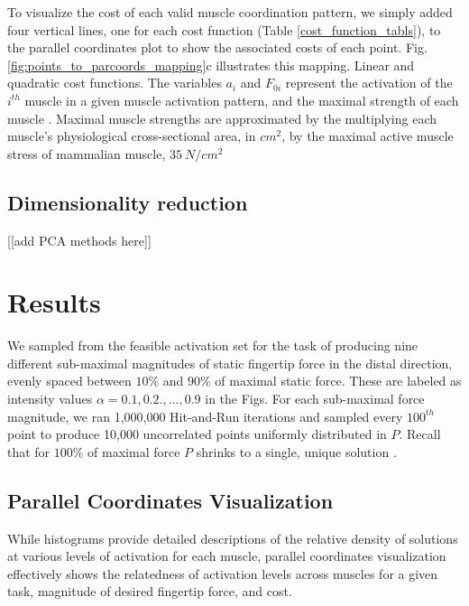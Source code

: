 \documentclass[10pt,letterpaper]{article}
\begin{document}
To visualize the cost of each valid muscle coordination pattern, we simply added four vertical lines, one for each cost function (Table \ref{cost_function_tabls}), to the parallel coordinates plot to show the associated costs of each point. Fig. \ref{fig:points_to_parcoords_mapping}c illustrates this mapping. Linear and quadratic cost functions. The variables $a_i$ and $F_{0i}$ represent the activation of the $i^{th}$ muscle in a given muscle activation pattern, and the maximal strength of each muscle \cite{Prilutsky2000Muscle,crowninshield1981physiologically}. Maximal muscle strengths are approximated by the multiplying  each muscle's physiological cross-sectional area, in $cm^2$, by the maximal active muscle stress of mammalian muscle, $35~N/{cm^2}$ \cite{Zajac1993Muscle}

\subsection*{Dimensionality reduction}

[[add PCA methods here]]


\section*{Results}

We sampled from the feasible activation set for the task of producing nine different sub-maximal magnitudes of static fingertip force in the distal direction, evenly spaced between  $10\%$ and $90\%$ of maximal static force. These are labeled as intensity values $\alpha = 0.1, 0.2., \hdots, 0.9$ in the Figs.  For each sub-maximal force magnitude, we ran 1,000,000 Hit-and-Run iterations and sampled every $100^{th}$ point to produce 10,000 uncorrelated points uniformly distributed in $P$. Recall that for $100\%$ of maximal force $P$ shrinks to a single, unique solution \cite{valero-cuevas2007large}.

\subsection*{Parallel Coordinates Visualization}
While histograms provide detailed descriptions of the relative density of solutions at various levels of activation for each muscle,  parallel coordinates visualization  effectively shows the relatedness of activation levels across muscles for a given task, magnitude of desired fingertip force, and cost.
\end{document}
